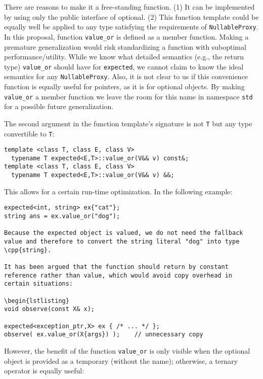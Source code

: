 \documentclass[a4paper,10pt]{article}
\newcommand{\cpp}[1]{\lstinline{#1}}
\begin{document}
There are reasons to make it a free-standing function. (1) It can be implemented by using only the public interface of optional. (2) This function template could be equally well be applied to any type satisfying the requirements of \cpp{NullableProxy}. In this proposal, function \cpp{value_or} is defined as a member function. Making a premature generalization would risk standardizing a function with suboptimal performance/utility. While we know what detailed semantics (e.g., the return type) \cpp{value_or} should have for \cpp{expected}, we cannot claim to know the ideal semantics for any \cpp{NullableProxy}. Also, it is not clear to us if this convenience function is equally useful for pointers, as it is for optional objects. By making \cpp{value_or} a member function we leave the room for this name in namespace \cpp{std} for a possible future generalization.

The second argument in the function template's signature is not \cpp{T} but any type convertible to \cpp{T}:

\begin{lstlisting}
template <class T, class E, class V> 
  typename T expected<E,T>::value_or(V&& v) const&;
template <class T, class E, class V> 
  typename T expected<E,T>::value_or(V&& v) &&;
\end{lstlisting}

This allows for a certain run-time optimization. In the following example:

\begin{lstlisting}
expected<int, string> ex{"cat"};
string ans = ex.value_or("dog");

Because the expected object is valued, we do not need the fallback value and therefore to convert the string literal "dog" into type \cpp{string}.

It has been argued that the function should return by constant reference rather than value, which would avoid copy overhead in certain situations:

\begin{lstlisting}
void observe(const X& x);

expected<exception_ptr,X> ex { /* ... */ };
observe( ex.value_or(X{args}) );    // unnecessary copy
\end{lstlisting}

However, the benefit of the function \cpp{value_or} is only visible when the optional object is provided as a temporary (without the name); otherwise, a ternary operator is equally useful:
\end{document}

